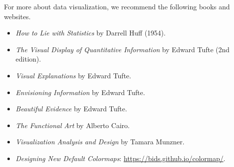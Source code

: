 For more about data visualization, we recommend the following books and websites.
\begin{itemize}
    \item \emph{How to Lie with Statistics} by Darrell Huff (1954).
    \item \emph{The Visual Display of Quantitative Information} by Edward Tufte (2nd edition).
    \item \emph{Visual Explanations} by Edward Tufte.
    \item \emph{Envisioning Information} by Edward Tufte.
    \item \emph{Beautiful Evidence} by Edward Tufte.
    \item \emph{The Functional Art} by Alberto Cairo.
    \item \emph{Visualization Analysis and Design} by Tamara Munzner.
    \item \emph{Designing New Default Colormaps}: \url{https://bids.github.io/colormap/}.
\end{itemize}
